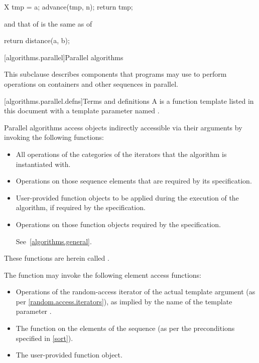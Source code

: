 \begin{codeblock}
X tmp = a;
advance(tmp, n);
return tmp;
\end{codeblock}

and that of
is the same as of

\begin{codeblock}
return distance(a, b);
\end{codeblock}

[algorithms.parallel]{Parallel algorithms}

\pnum
This subclause describes components that \Cpp programs may use to perform
operations on containers and other sequences in parallel.

[algorithms.parallel.defns]{Terms and definitions}
\pnum
A  is a function template listed in this document with
a template parameter named .

\pnum
Parallel algorithms access objects indirectly accessible via their arguments by
invoking the following functions:

\begin{itemize}
\item
All operations of the categories of the iterators that the algorithm is
instantiated with.

\item
Operations on those sequence elements that are required by its specification.

\item
User-provided function objects to be applied during the execution of the
algorithm, if required by the specification.

\item
Operations on those function objects required by the specification.
\begin{note} See~\ref{algorithms.general}.\end{note}
\end{itemize}

These functions are herein called .
\begin{example}
The  function may invoke the following element access functions:

\begin{itemize}
\item
Operations of the random-access iterator of the actual template argument
(as per \ref{random.access.iterators}),
as implied by the name of the template parameter .

\item
The  function on the elements of the sequence (as per the
preconditions specified in \ref{sort}).

\item
The user-provided  function object.
\end{itemize}
\end{example}

